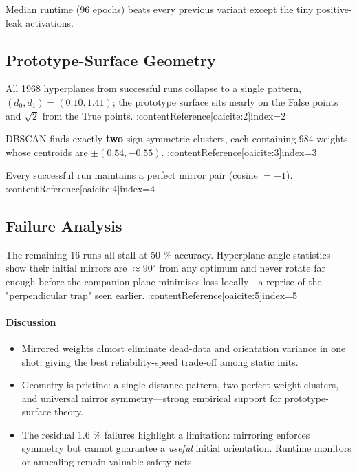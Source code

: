 Median runtime (96 epochs) beats every previous variant except the tiny
positive-leak activations.

\subsection*{Prototype-Surface Geometry}

\begin{description}[leftmargin=2em]
  \item[Distance clusters]  
        All 1968 hyperplanes from successful runs collapse to a single
        pattern, \((d_{0},d_{1})=(0.10,1.41)\); the prototype surface
        sits nearly on the False points and \(\sqrt2\) from the True
        points. :contentReference[oaicite:2]{index=2}
  \item[Weight clusters]  
        DBSCAN finds exactly \textbf{two} sign-symmetric clusters, each
        containing 984 weights whose centroids are \(\pm(0.54,-0.55)\). :contentReference[oaicite:3]{index=3}
  \item[Mirror symmetry]  
        Every successful run maintains a perfect mirror pair (cosine
        \(=-1\)). :contentReference[oaicite:4]{index=4}
\end{description}

\subsection*{Failure Analysis}
The remaining 16 runs all stall at 50 \% accuracy.  Hyperplane-angle
statistics show their initial mirrors are
\(\approx\!90^{\circ}\) from any optimum and never rotate far enough
before the companion plane minimises loss locally—a reprise of the
"perpendicular trap" seen earlier. :contentReference[oaicite:5]{index=5}

\paragraph{Discussion}
\begin{itemize}
  \item Mirrored weights almost eliminate dead-data and orientation
        variance in one shot, giving the best reliability-speed trade-off
        among static inits.
  \item Geometry is pristine: a single distance pattern, two perfect
        weight clusters, and universal mirror symmetry—strong empirical
        support for prototype-surface theory.
  \item The residual 1.6 \% failures highlight a limitation: mirroring
        enforces symmetry but cannot guarantee a \emph{useful} initial
        orientation.  Runtime monitors or annealing remain valuable
        safety nets.
\end{itemize}

\hrulefill
